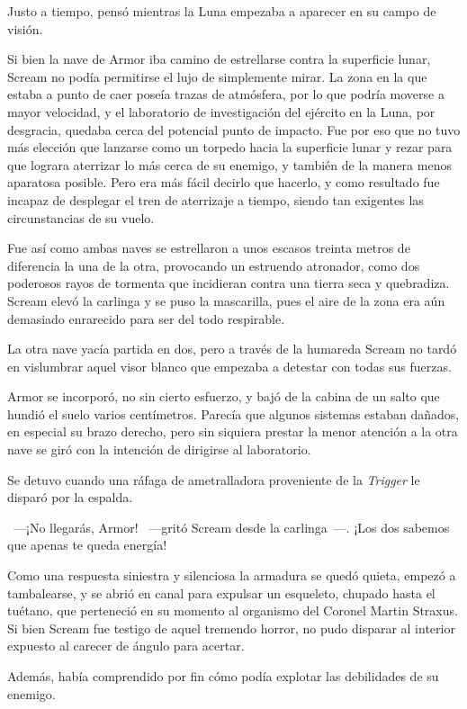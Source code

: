 Justo a tiempo, pensó mientras la Luna empezaba a aparecer en su campo de visión.

Si bien la nave de Armor iba camino de estrellarse contra la superficie lunar, Scream no podía permitirse el lujo de simplemente mirar. La zona en la que estaba a punto de caer poseía trazas de atmósfera, por lo que podría moverse a mayor velocidad, y el laboratorio de investigación del ejército en la Luna, por desgracia, quedaba cerca del potencial punto de impacto. Fue por eso que no tuvo más elección que lanzarse como un torpedo hacia la superficie lunar y rezar para que lograra aterrizar lo más cerca de su enemigo, y también de la manera menos aparatosa posible. Pero era más fácil decirlo que hacerlo, y como resultado fue incapaz de desplegar el tren de aterrizaje a tiempo, siendo tan exigentes las circunstancias de su vuelo.

Fue así como ambas naves se estrellaron a unos escasos treinta metros de diferencia la una de la otra, provocando un estruendo atronador, como dos poderosos rayos de tormenta que incidieran contra una tierra seca y quebradiza. Scream elevó la carlinga y se puso la mascarilla, pues el aire de la zona era aún demasiado enrarecido para ser del todo respirable.

La otra nave yacía partida en dos, pero a través de la humareda Scream no tardó en vislumbrar aquel visor blanco que empezaba a detestar con todas sus fuerzas.

Armor se incorporó, no sin cierto esfuerzo, y bajó de la cabina de un salto que hundió el suelo varios centímetros. Parecía que algunos sistemas estaban dañados, en especial su brazo derecho, pero sin siquiera prestar la menor atención a la otra nave se giró con la intención de dirigirse al laboratorio.

Se detuvo cuando una ráfaga de ametralladora proveniente de la \emph{Trigger} le disparó por la espalda.

~---¡No llegarás, Armor! ~---gritó Scream desde la carlinga~---. ¡Los dos sabemos que apenas te queda energía!

Como una respuesta siniestra y silenciosa la armadura se quedó quieta, empezó a tambalearse, y se abrió en canal para expulsar un esqueleto, chupado hasta el tuétano, que perteneció en su momento al organismo del Coronel Martin Straxus. Si bien Scream fue testigo de aquel tremendo horror, no pudo disparar al interior expuesto al carecer de ángulo para acertar.

Además, había comprendido por fin cómo podía explotar las debilidades de su enemigo.

